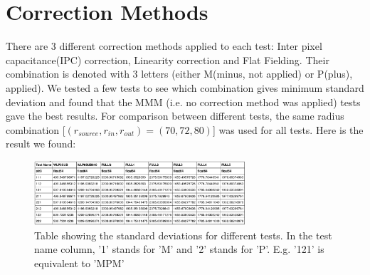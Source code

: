 \documentclass{aastex6}
\begin{document}
\section{Correction Methods}
There are 3 different correction methods applied to each test: Inter pixel capacitance(IPC) correction, Linearity correction and Flat Fielding. Their combination is denoted with 3 letters (either M(minus, not applied) or P(plus), applied). We tested a few tests to see which combination gives minimum standard deviation and found that the MMM (i.e. no correction method was applied) tests gave the best results. For comparison between different tests, the same radius combination [$(r_{source}, r_{in}, r_{out}) = (70, 72, 80)$] was used for all tests. Here is the result we found:  \\
\begin{figure}[H]
    \centering
    \includegraphics[width=0.7\textwidth]{correction}
    \caption{Table showing the standard deviations for different tests. In the test name column, '1' stands for 'M' and '2' stands for 'P'. E.g. '121' is equivalent to 'MPM'}
\end{figure}
\end{document}

